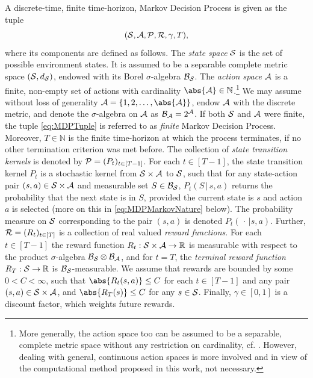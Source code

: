 \documentclass[
    a4paper,
    11pt,
    bibliography=totoc,
    listof=totoc,      
    headinclude=true,
    cleardoublepage=empty,
]{scrbook}
\theoremstyle{plain}
\theoremstyle{definition}
\theoremstyle{remark}
\newcommand{\SetR}{\mathbb R}
\newcommand{\SetN}{\mathbb N}
\newcommand{\SpaceS}{{\cal S}}
\newcommand{\SpaceA}{{\cal A}}
\newcommand{\KernelP}{{\cal P}}
\newcommand{\KernelR}{{\cal R}}
\begin{document}
A discrete-time, finite time-horizon, Markov Decision Process is given as the tuple
\begin{equation}
\label{eq:MDPTuple}
    (\SpaceS, \SpaceA, \KernelP, \KernelR, \gamma, T),
\end{equation}
where its components are defined as follows. 
The \textit{state space} $\SpaceS$ is the set of possible environment states. 
It is assumed to be a separable complete metric space $(\SpaceS, d_\SpaceS)$, 
endowed with its Borel $\sigma$-algebra $\mathcal{B}_{\SpaceS}$.
The \textit{action space} $\SpaceA$ is a finite, non-empty set of actions with 
cardinality $\abs{\SpaceA}\in\SetN$.\footnote{
    More generally, the action space too can be assumed to be a separable,
    complete metric space without any restriction on cardinality, cf.
    \cite{hinderer2016_do}. However, dealing with general, continuous action
    spaces is more involved and in view of the computational method proposed in
    this work, not necessary.
} 
We may assume without loss of generality $\SpaceA = \{1,2,\dots,
\abs{\SpaceA}\}$, endow $\SpaceA$ with the discrete metric, and denote 
the $\sigma$-algebra on $\SpaceA$ as $\mathcal{B}_\SpaceA=2^{\SpaceA}$. If 
both $\SpaceS$ and $\SpaceA$ were finite, the tuple \eqref{eq:MDPTuple} is 
referred to as \textit{finite} Markov Decision Process.
Moreover, 
$T\in\SetN$ is the finite time-horizon at which the process terminates, if no other 
termination criterion was met before.
The collection of \textit{state transition
kernels} is denoted by 
$\KernelP = (P_t)_{t\in[T-1]}$. 
For each $t\in[T-1]$, the state transition kernel $P_t$ is a
stochastic kernel from $\SpaceS \times \SpaceA$ to $\SpaceS$, such that for 
any state-action pair $(s,a) \in \SpaceS \times \SpaceA$ and measurable set
$S \in \mathcal{B}_\SpaceS$, $P_t(S\,|\,s,a)$ returns the probability that the
next state is in $S$, provided the current state is $s$ and action $a$ is 
selected (more on this in \cref{eq:MDPMarkovNature} below). The probability 
measure on $\SpaceS$ corresponding to the pair $(s,a)$ is denoted $P_t(\,
\cdot\,|s,a)$.
Further, $\KernelR = (R_t)_{t\in[T]}$ is a collection of real valued
\textit{reward functions}. For each $t\in[T-1]$ the reward function
$R_t:\SpaceS \times \SpaceA \to \SetR$ is measurable with respect to the
product $\sigma$-algebra $\mathcal{B}_\SpaceS\otimes\mathcal{B}_\SpaceA$, and 
for $t=T$, the \textit{terminal reward function} $R_T:\SpaceS \to \SetR$ is 
$\mathcal{B}_\SpaceS$-measurable. We assume that rewards are bounded by some  
$0<C<\infty$, such that $\abs{R_t(s,a)} \leq C$ for each $t\in[T-1]$ and any 
pair $(s,a)\in\SpaceS\times\SpaceA$, and $\abs{R_T(s)} \leq C$ for any 
$s\in\SpaceS$.
Finally, $\gamma\in[0,1]$ is a discount factor, which weights future rewards.
\end{document}
